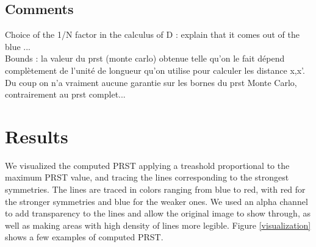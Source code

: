 \documentclass[10pt,a4paper]{article}			%
\begin{document}
  	\subsection{Comments}
  	Choice of the 1/N factor in the calculus of D : explain that it comes out of the blue ... \\
  	
  	Bounds : la valeur du prst (monte carlo) obtenue telle qu'on le fait dépend complètement de l'unité de longueur qu'on utilise pour calculer les distance x,x'. Du coup on n'a vraiment aucune garantie sur les bornes du prst Monte Carlo, contrairement au prst complet...\\
  	
  	
  	\section{Results}

We visualized the computed PRST applying a treashold proportional to the maximum PRST value, and tracing the lines corresponding to the strongest symmetries. The lines are traced in colors ranging from blue to red, with red for the stronger symmetries and blue for the weaker ones. We used an alpha channel to add transparency to the lines and allow the original image to show through, as well as making areas with high density of lines more legible. Figure \ref{visualization} shows a few examples of computed PRST.
\end{document}

